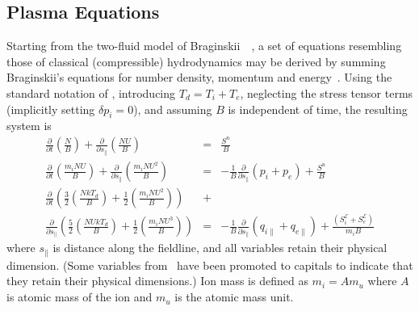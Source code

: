 \subsection{Plasma Equations}\label{sec:sys23plas}

Starting from the two-fluid model of Braginskii~~\cite{Br65Tranwarv},
a set of equations resembling those of classical (compressible) hydrodynamics
may be derived by summing Braginskii's equations for number density,
momentum and energy~\cite{Ha13Benc}.
Using the standard notation of , introducing $T_d=T_i+T_e$,
neglecting the stress tensor terms (implicitly setting $\delta p_i=0$),
and assuming $B$ is independent of time, the resulting system is
\begin{eqnarray}\label{eq:sysn1}
\frac{\partial}{\partial t} (\frac{N}{B})+ 
\frac{\partial}{\partial s_{\|}} (\frac{N U}{B})&=&\frac{S^n}{B} \\
\frac{\partial}{\partial t} (\frac{m_i N U}{B})+ 
\frac{\partial}{\partial s_{\|}} (\frac{m_i N U^2}{B})&=&
-\frac{1}{B}\frac{\partial}{\partial s_{\|}} (p_i + p_e) +\frac{S^u}{B} \label{eq:sysu1}\\
\frac{\partial}{\partial t}\left( \frac{3}{2}(\frac{N k T_d}{B})+
\frac{1}{2} (\frac{m_i N U^2}{B}) \right) &+& \nonumber \\
\frac{\partial}{\partial s_{\|}} \left( \frac{5}{2}(\frac{N U k T_d}{B}) +
\frac{1}{2} (\frac{m_i N U^3}{B}) \right) &=&
-\frac{1}{B}\frac{\partial}{\partial s_{\|}} (q_{i\|} + q_{e\|}) +
\frac{(S_i^\mathcal{E}+S_e^\mathcal{E})}{m_i B} \label{eq:syst1}
\end{eqnarray}
where $s_{\|}$ is distance along the fieldline,
and all variables retain their physical dimension. (Some variables from~\cite{Ha13Benc}
have been promoted to capitals to 
indicate that they retain their physical dimensions.)
Ion mass is defined as $m_i= Am_u$ where
$A$ is atomic mass of the ion and $m_u$ is the atomic mass unit. 

